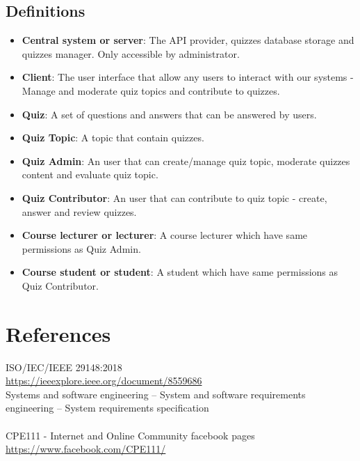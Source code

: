 \documentclass[ 10pt]{report}
\begin{document}
        \section{Definitions}
        \begin{itemize}
            \item \textbf{Central system or server}: The API provider, quizzes database storage and quizzes manager. Only accessible by administrator.
            \item \textbf{Client}: The user interface that allow any users to interact with our systems - Manage and moderate quiz topics and contribute to quizzes.
            \item \textbf{Quiz}: A set of questions and answers that can be answered by users.
            \item \textbf{Quiz Topic}: A topic that contain quizzes.
            \item \textbf{Quiz Admin}: An user that can create/manage quiz topic, moderate quizzes content and evaluate quiz topic.
            \item \textbf{Quiz Contributor}: An user that can contribute to quiz topic - create, answer and review quizzes.
            \item \textbf{Course lecturer or lecturer}: A course lecturer which have same permissions as Quiz Admin.
            \item \textbf{Course student or student}: A student which have same permissions as Quiz Contributor.
        \end{itemize}
    \pagebreak

    \chapter{References}
    \noindent ISO/IEC/IEEE 29148:2018 \\
    \href{https://ieeexplore.ieee.org/document/8559686}{https://ieeexplore.ieee.org/document/8559686} \\
    Systems and software engineering -- System and software requirements engineering -- System requirements specification \\\\

    \noindent CPE111 - Internet and Online Community facebook pages \\
    \href{https://www.facebook.com/CPE111/}{https://www.facebook.com/CPE111/} \\\\
\end{document}
